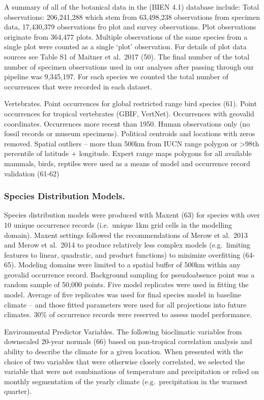 \documentclass[]{article}
\begin{document}
A summary of all of the botanical data in the (BIEN 4.1) database include: Total observations: 206,241,288 which stem from 63,498,238 observations from specimen data, 17,430,379 observations fro plot and survey observations. Plot observations originate from 364,477 plots. Multiple observations of the same species from a single plot were counted as a single `plot' observation. For details of plot data sources see Table S1 of Maitner et al.~2017 (50). The final number of the total number of specimen observations used in our analyses after passing through our pipeline was 9,345,197. For each species we counted the total number of occurrences that were recorded in each dataset.

Vertebrates. Point occurrences for global restricted range bird species (61). Point occurrences for tropical vertebrates (GBIF, VertNet). Occurrences with geovalid coordinates. Occurrences more recent than 1950. Human observations only (no fossil records or museum specimens). Political centroids and locations with zeros removed. Spatial outliers -- more than 500km from IUCN range polygon or \textgreater{}98th percentile of latitude + longitude. Expert range maps polygons for all available mammals, birds, reptiles were used as a means of model and occurrence record validation (61-62)

\hypertarget{species-distribution-models.}{%
\subsubsection{Species Distribution Models.}\label{species-distribution-models.}}

Species distribution models were produced with Maxent (63) for species with over 10 unique occurrence records (i.e.~unique 1km grid cells in the modelling domain). Maxent settings followed the recommendations of Merow et al.~2013 and Merow et al.~2014 to produce relatively less complex models (e.g.~limiting features to linear, quadratic, and product functions) to minimize overfitting (64-65). Modeling domains were limited to a spatial buffer of 500km within any geovalid occurrence record. Background sampling for pseudoabsence point was a random sample of 50,000 points. Five model replicates were used in fitting the model. Average of five replicates was used for final species model in baseline climate -- and those fitted parameters were used for all projections into future climates. 30\% of occurrence records were reserved to assess model performance.

Environmental Predictor Variables. The following bioclimatic variables from downscaled 20-year normals (66) based on pan-tropical correlation analysis and ability to describe the climate for a given location. When presented with the choice of two variables that were otherwise closely correlated, we selected the variable that were not combinations of temperature and precipitation or relied on monthly segmentation of the yearly climate (e.g.~precipitation in the warmest quarter).
\end{document}

